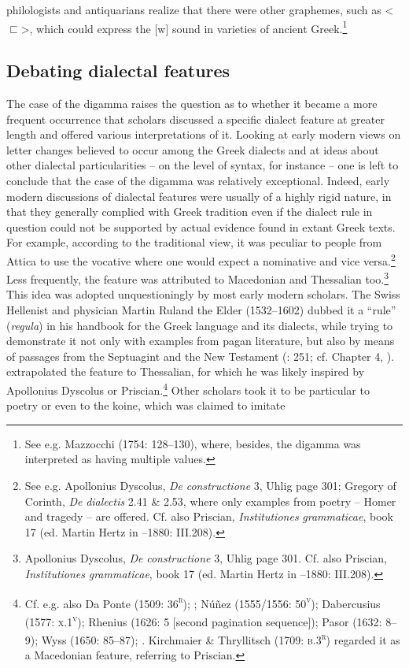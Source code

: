 \begin{styleCatalogusnotities}
philologists and antiquarians realize that there were other graphemes, such as <${\sqsubset}$>, which could express the [w] sound in varieties of ancient Greek.\footnote{ \textrm{See e.g. Mazzocchi (1754: 128–130), where, besides, the digamma was interpreted as having multiple values.}}
\end{styleCatalogusnotities}

\subsection{Debating dialectal features}
\hypertarget{Toc19704847}{}
The case of the digamma raises the question as to whether it became a more frequent occurrence that scholars discussed a specific dialect feature at greater length and offered various interpretations of it. Looking at early modern views on letter changes believed to occur among the Greek dialects and at ideas about other dialectal particularities – on the level of syntax, for instance – one is left to conclude that the case of the digamma was relatively exceptional. Indeed, early modern discussions of dialectal features were usually of a highly rigid nature, in that they generally complied with Greek tradition even if the dialect rule in question could not be supported by actual evidence found in extant Greek texts. For example, according to the traditional view, it was peculiar to people from Attica to use the vocative where one would expect a nominative and vice versa.\footnote{See e.g. Apollonius Dyscolus, \textit{De} \textit{constructione} 3, Uhlig page 301; Gregory of Corinth, \textit{De} \textit{dialectis} 2.41 \& 2.53, where only examples from poetry – Homer and tragedy – are offered. Cf. also Priscian, \textit{Institutiones} \textit{grammaticae}, book 17 (ed. Martin Hertz in \citealt{Keil1855}–1880: III.208).} Less frequently, the feature was attributed to Macedonian and Thessalian too.\footnote{Apollonius Dyscolus, \textit{De} \textit{constructione} 3, Uhlig page 301. Cf. also Priscian, \textit{Institutiones} \textit{grammaticae}, book 17 (ed. Martin Hertz in \citealt{Keil1855}–1880: III.208).} This idea was adopted unquestioningly by most early modern scholars. The Swiss Hellenist and physician Martin Ruland the Elder (1532–1602) dubbed it a “rule” (\textit{regula}) in his handbook for the Greek language and its dialects, while trying to demonstrate it not only with examples from pagan literature, but also by means of passages from the Septuagint and the New Testament (\citealt{Ruland1556}: 251; cf. Chapter 4, ). \citet[302]{Ruland1556} extrapolated the feature to Thessalian, for which he was likely inspired by Apollonius Dyscolus or Priscian.\footnote{Cf. e.g. also Da Ponte (1509: 36\textsc{\textsuperscript{r}}); \citet[216]{Vergara1537}; Núñez (1555/1556: 50\textsc{\textsuperscript{v}}); Dabercusius (1577: \textsc{x.1}\textsc{\textsuperscript{v}}); Rhenius (1626: 5 [second pagination sequence]); Pasor (1632: 8–9); Wyss (1650: 85–87); \citet[88]{Leusden1670}. Kirchmaier \& Thryllitsch (1709: \textsc{b.3}\textsc{\textsuperscript{r}}) regarded it as a Macedonian feature, referring to Priscian.} Other scholars took it to be particular to poetry or even to the koine, which was claimed to imitate 
